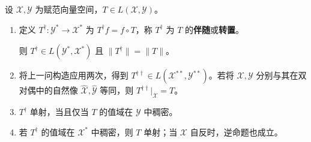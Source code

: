 \documentclass[../../main.tex]{subfiles}
\begin{document}
\begin{exercise}\label{exercise:ch05-adjoint}
设 $\mathcal X,\mathcal Y$ 为赋范向量空间，$T\in L(\mathcal X,\mathcal Y)$。
\begin{enumerate}
\item\label{item:ch05-adjoint-norm}
\begin{definition*}[伴随算子]\label{definition:ch05-adjoint-operator}
定义 $T^\dagger:\mathcal Y^*\to\mathcal X^*$ 为 $T^\dagger f=f\circ T$，称 $T^\dagger$ 为 $T$ 的\textbf{伴随}或\textbf{转置}。
\end{definition*}
则 $T^\dagger\in L(\mathcal Y^*,\mathcal X^*)$ 且 $\|T^\dagger\|=\|T\|$。
\item\label{item:ch05-second-adjoint} 将上一问构造应用两次，得到 $T^{\dagger\dagger}\in L(\mathcal X^{**},\mathcal Y^{**})$。若将 $\mathcal X,\mathcal Y$ 分别与其在双对偶中的自然像 $\widehat{\mathcal X},\widehat{\mathcal Y}$ 等同，则 $T^{\dagger\dagger}|_{\mathcal X}=T$。
\item\label{item:ch05-adjoint-injective} $T^\dagger$ 单射，当且仅当 $T$ 的值域在 $\mathcal Y$ 中稠密。
\item\label{item:ch05-adjoint-dense-range} 若 $T^\dagger$ 的值域在 $\mathcal X^*$ 中稠密，则 $T$ 单射；当 $\mathcal X$ 自反时，逆命题也成立。
\end{enumerate}
\end{exercise}
\end{document}
